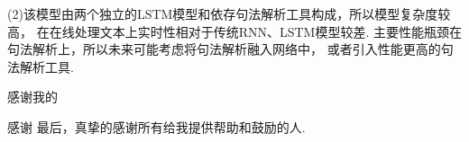 \documentclass[bachelor,adobefonts]{jnuthesis}
\begin{document}
(2)该模型由两个独立的LSTM模型和依存句法解析工具构成，所以模型复杂度较高，
在在线处理文本上实时性相对于传统RNN、LSTM模型较差.
主要性能瓶颈在句法解析上，所以未来可能考虑将句法解析融入网络中，
或者引入性能更高的句法解析工具.


\nocite{*}

%
%

\begin{acknowledgement}
感谢我的

感谢
最后，真挚的感谢所有给我提供帮助和鼓励的人.
\end{acknowledgement}

\backmatter




\end{document}
